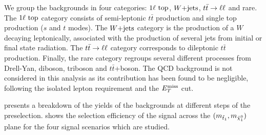     We group the backgrounds in four categories: $1\ell~\text{top}$, $\text{$W$+jets}$,
    $t\bar{t} \rightarrow \ell \ell$ and rare. The $1\ell~\text{top}$ category consists of
    semi-leptonic $t\bar{t}$ production and single top production ($s$ and $t$
    modes). The $\text{$W$+jets}$ category is the production of a $W$ decaying
    leptonically, associated with the production of several jets from initial or
    final state radiation. The $t\bar{t} \rightarrow \ell \ell$ category corresponds to dileptonic
    $t\bar{t}$ production. Finally, the rare category regroups several different
    processes from Drell-Yan, diboson, triboson and $t\bar{t}$+boson. The QCD
    background is not considered in this analysis as its contribution has been
    found to be negligible, following the isolated lepton requirement and the
    $E_T^\text{miss}$ cut.

     presents a breakdown of the yields of the
    backgrounds at different steps of the preselection.
     shows the selection efficiency of the
    signal across the $(m_{\tilde{t}_1}, m_{\tilde{\chi}_1^0})$ plane for the four
    signal scenarios which are studied.

